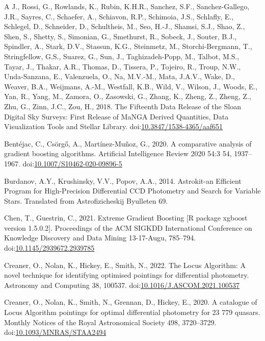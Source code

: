\documentclass[]{elsarticle} %
\newlength{\cslhangindent}
\newlength{\cslentryspacingunit} %
\newenvironment{CSLReferences}[2] %
 {%
  \setlength{\parindent}{0pt}
  \ifodd #1
  \let\oldpar\par
  \def\par{\hangindent=\cslhangindent\oldpar}
  \fi
  \setlength{\parskip}{#2\cslentryspacingunit}
 }%
 {}
\begin{document}
\begin{CSLReferences}{1}{0}
A.J., Rossi, G., Rowlands, K., Rubin, K.H.R., Sanchez, S.F.,
Sanchez-Gallego, J.R., Sayres, C., Schaefer, A., Schiavon, R.P.,
Schimoia, J.S., Schlafly, E., Schlegel, D., Schneider, D., Schultheis,
M., Seo, H.-J., Shamsi, S.J., Shao, Z., Shen, S., Shetty, S., Simonian,
G., Smethurst, R., Sobeck, J., Souter, B.J., Spindler, A., Stark, D.V.,
Stassun, K.G., Steinmetz, M., Storchi-Bergmann, T., Stringfellow, G.S.,
Suarez, G., Sun, J., Taghizadeh-Popp, M., Talbot, M.S., Tayar, J.,
Thakar, A.R., Thomas, D., Tissera, P., Tojeiro, R., Troup, N.W.,
Unda-Sanzana, E., Valenzuela, O., Na, M.V.-M., Mata, J.A.V., Wake, D.,
Weaver, B.A., Weijmans, A.-M., Westfall, K.B., Wild, V., Wilson, J.,
Woods, E., Yan, R., Yang, M., Zamora, O., Zasowski, G., Zhang, K.,
Zheng, Z., Zheng, Z., Zhu, G., Zinn, J.C., Zou, H., 2018. {The Fifteenth
Data Release of the Sloan Digital Sky Surveys: First Release of MaNGA
Derived Quantities, Data Visualization Tools and Stellar Library}.
doi:\href{https://doi.org/10.3847/1538-4365/aaf651}{10.3847/1538-4365/aaf651}

\leavevmode{}%
Bentéjac, C., Csörgő, A., Martínez-Muñoz, G., 2020. {A comparative
analysis of gradient boosting algorithms}. Artificial Intelligence
Review 2020 54:3 54, 1937--1967.
doi:\href{https://doi.org/10.1007/S10462-020-09896-5}{10.1007/S10462-020-09896-5}

\leavevmode{}%
Burdanov, A.Y., Krushinsky, V.V., Popov, A.A., 2014. {Astrokit-an
Efficient Program for High-Precision Differential CCD Photometry and
Search for Variable Stars}. Translated from Astrofizicheskij Byulleten
69.

\leavevmode{}%
Chen, T., Guestrin, C., 2021. {Extreme Gradient Boosting {[}R package
xgboost version 1.5.0.2{]}}. Proceedings of the ACM SIGKDD International
Conference on Knowledge Discovery and Data Mining 13-17-Augu, 785--794.
doi:\href{https://doi.org/10.1145/2939672.2939785}{10.1145/2939672.2939785}

\leavevmode{}%
Creaner, O., Nolan, K., Hickey, E., Smith, N., 2022. {The Locus
Algorithm: A novel technique for identifying optimised pointings for
differential photometry}. Astronomy and Computing 38, 100537.
doi:\href{https://doi.org/10.1016/J.ASCOM.2021.100537}{10.1016/J.ASCOM.2021.100537}

\leavevmode{}%
Creaner, O., Nolan, K., Smith, N., Grennan, D., Hickey, E., 2020. {A
catalogue of Locus Algorithm pointings for optimal differential
photometry for 23 779 quasars}. Monthly Notices of the Royal
Astronomical Society 498, 3720--3729.
doi:\href{https://doi.org/10.1093/MNRAS/STAA2494}{10.1093/MNRAS/STAA2494}


\end{CSLReferences}
\end{document}
